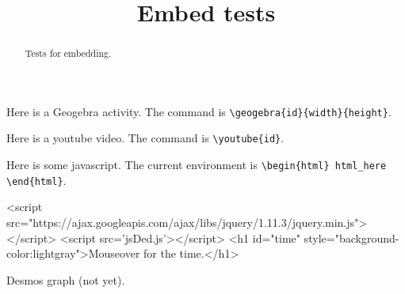 \documentclass[handout]{ximera}
\title{Embed tests}
\begin{document}
	
\begin{abstract}
Tests for embedding.
\end{abstract}

\maketitle

Here is a Geogebra activity. The command is \verb+\geogebra{id}{width}{height}+.


Here is a youtube video. The command is \verb+\youtube{id}+.


Here is some javascript. The current environment is \verb+\begin{html} html_here \end{html}+.

\begin{html}
<script src="https://ajax.googleapis.com/ajax/libs/jquery/1.11.3/jquery.min.js"></script>
<script src='jsDed.js'></script>
<h1 id="time" style="background-color:lightgray">Mouseover for the time.</h1>
\end{html}

Desmos graph (not yet).


\end{document}

